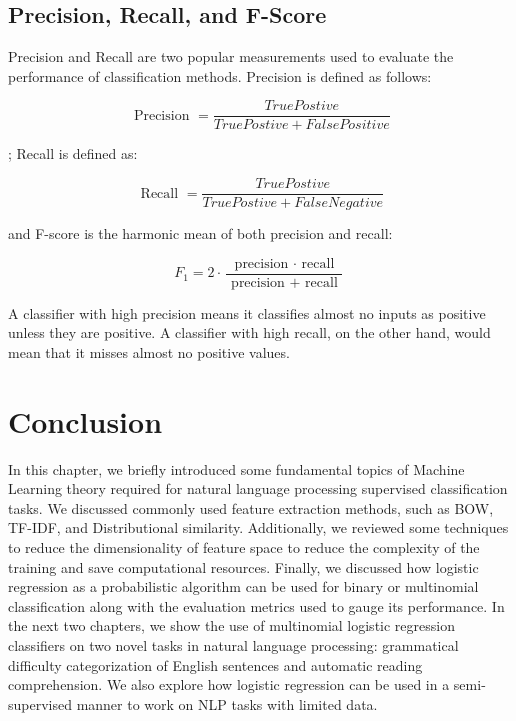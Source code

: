 \subsection{Precision, Recall, and F-Score}

Precision and Recall are two popular measurements used to evaluate the performance of classification methods. Precision is defined as follows:

$$\text { Precision } = \frac { True Postive } { True Postive + False Positive }$$

; Recall is defined as:

$$\text { Recall } = \frac { True Postive } { True Postive + False Negative }$$

and F-score is the harmonic mean of both precision and recall:

$$F _ { 1 } = 2 \cdot \frac { \text { precision } \cdot \text { recall } } { \text { precision } + \text { recall } }$$

A classifier with high precision means it classifies almost no inputs as positive unless they are positive. A classifier with high recall, on the other hand, would mean that  it misses almost no positive values. 
\section{Conclusion}

In this chapter, we briefly introduced some fundamental topics of Machine Learning theory required for natural language processing supervised classification tasks. We discussed commonly used feature extraction methods, such as BOW, TF-IDF, and Distributional similarity. Additionally, we reviewed some techniques to reduce the dimensionality of feature space to reduce the complexity of the training and save computational resources. Finally, we discussed how logistic regression as a probabilistic algorithm can be used for binary or multinomial classification along with the evaluation metrics used to gauge its performance. In the next two chapters, we show the use of multinomial logistic regression classifiers on two novel tasks in natural language processing: grammatical difficulty categorization of English sentences and automatic reading comprehension. We also explore how logistic regression can be used in a semi-supervised manner to work on NLP tasks with limited data. 